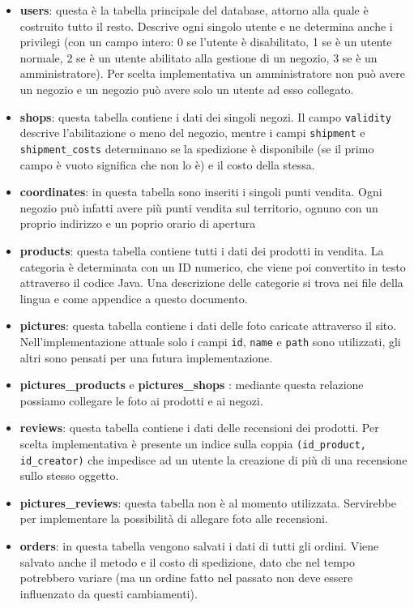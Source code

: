 \begin{itemize}
  \item \textbf{users}: questa è la tabella principale del database, attorno alla quale è costruito tutto il resto. Descrive ogni singolo utente e ne determina anche i privilegi (con un campo intero: 0 se l'utente è disabilitato, 1 se è un utente normale, 2 se è un utente abilitato alla gestione di un negozio, 3 se è un amministratore). Per scelta implementativa un amministratore non può avere un negozio e un negozio può avere solo un utente ad esso collegato.
  \item \textbf{shops}: questa tabella contiene i dati dei singoli negozi. Il campo \texttt{validity} descrive l'abilitazione o meno del negozio, mentre i campi \texttt{shipment} e \texttt{shipment\_costs} determinano se la spedizione è disponibile (se il primo campo è vuoto significa che non lo è) e il costo della stessa.
  \item \textbf{coordinates}: in questa tabella sono inseriti i singoli punti vendita. Ogni negozio può infatti avere più punti vendita sul territorio, ognuno con un proprio indirizzo e un poprio orario di apertura
  \item \textbf{products}: questa tabella contiene tutti i dati dei prodotti in vendita. La categoria è determinata con un ID numerico, che viene poi convertito in testo attraverso il codice Java. Una descrizione delle categorie si trova nei file della lingua e come appendice a questo documento.
  \item \textbf{pictures}: questa tabella contiene i dati delle foto caricate attraverso il sito. Nell'implementazione attuale solo i campi \texttt{id}, \texttt{name} e \texttt{path} sono utilizzati, gli altri sono pensati per una futura implementazione.
  \item \textbf{pictures\_products} e \textbf{pictures\_shops} : mediante questa relazione possiamo collegare le foto ai prodotti e ai negozi.
  \item \textbf{reviews}: questa tabella contiene i dati delle recensioni dei prodotti. Per scelta  implementativa è presente un indice sulla coppia \texttt{(id\_product, id\_creator)} che impedisce ad un utente la creazione di più di una recensione sullo stesso oggetto.
  \item \textbf{pictures\_reviews}: questa tabella non è al momento utilizzata. Servirebbe per implementare la possibilità di allegare foto  alle recensioni.
  \item \textbf{orders}: in questa tabella vengono salvati i dati di tutti gli ordini. Viene salvato anche il metodo e il costo di spedizione, dato che nel tempo potrebbero variare (ma un ordine fatto nel passato non deve essere influenzato da questi cambiamenti).

\end{itemize}
